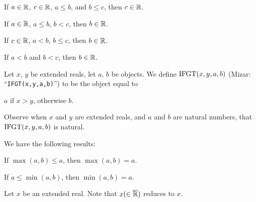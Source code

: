 \documentclass{article}
\begin{document}
\section{}
\begin{thm}
\item\label{xxreal0:45} If $a\in\mathbb{R}$, $c\in\mathbb{R}$, $a\leq b$, and $b\leq c$,
  then $c\in\mathbb{R}$.
\item\label{xxreal0:46} If $a\in\mathbb{R}$, $a\leq b$, $b<c$, then $b\in\mathbb{R}$.
\item\label{xxreal0:47} If $c\in\mathbb{R}$, $a<b$, $b\leq c$, then $b\in\mathbb{R}$.
\item\label{xxreal0:48} If $a<b$ and $b<c$, then $b\in\mathbb{R}$.
\end{thm}

\begin{definition}
Let $x$, $y$ be extended reals, let $a$, $b$ be objects.
We define $\operatorname{IFGT}(x,y,a,b)$ (Mizar: ``\verb#IFGT(x,y,a,b)#'') to be
the object equal to
\begin{defn}
\item $a$ if $x>y$, otherwise $b$.
\end{defn}
\end{definition}

Observe when $x$ and $y$ are extended reals, and $a$ and $b$ are natural
numbers, that $\operatorname{IFGT}(x,y,a,b)$ is natural.

We have the following results:
\begin{thm}
\item\label{xxreal0:49} If $\max(a,b)\leq a$, then $\max(a,b)=a$.
\item\label{xxreal0:50} If $a\leq\min(a,b)$, then $\min(a,b)=a$.
\end{thm}

Let $x$ be an extended real. Note that $x(\in \overline{\mathbb{R}})$ reduces to $x$.
\end{document}
